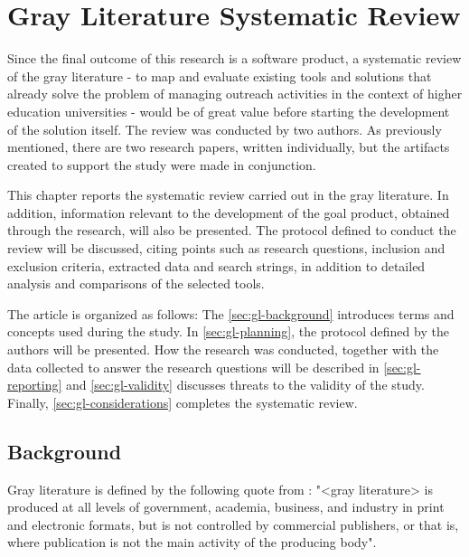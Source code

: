 \chapter{Gray Literature Systematic Review}\label{grayliterature}

Since the final outcome of this research is a software product, a systematic review of the gray literature - to map and evaluate existing tools and solutions that already solve the problem of managing outreach activities in the context of higher education universities - would be of great value before starting the development of the solution itself. The review was conducted by two authors. As previously mentioned, there are two research papers, written individually, but the artifacts created to support the study were made in conjunction.

This chapter reports the systematic review carried out in the gray literature. In addition, information relevant to the development of the goal product, obtained through the research, will also be presented. The protocol defined to conduct the review will be discussed, citing points such as research questions, inclusion and exclusion criteria, extracted data and search strings, in addition to detailed analysis and comparisons of the selected tools.

The article is organized as follows: The \autoref{sec:gl-background} introduces terms and concepts used during the study. In \autoref{sec:gl-planning}, the protocol defined by the authors will be presented. How the research was conducted, together with the data collected to answer the research questions will be described in \autoref{sec:gl-reporting} and \autoref{sec:gl-validity} discusses threats to the validity of the study. Finally, \autoref{sec:gl-considerations} completes the systematic review.

\section{Background}\label{sec:gl-background}

Gray literature is defined by the following quote from \cite{garousi2019guidelines}: "<gray literature> is produced at all levels of government, academia, business, and industry in print and electronic formats, but is not controlled by commercial publishers, or that is, where publication is not the main activity of the producing body".


